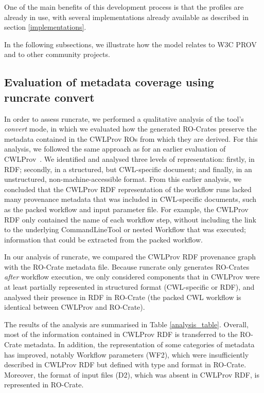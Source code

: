 \documentclass[10pt,letterpaper]{article}
\begin{document}
One of the main benefits of this development process is that the profiles are already in use, with several implementations already available as described in section \ref{implementations}.

In the following subsections, we illustrate how the model relates to W3C PROV and to other community projects.


\subsection{Evaluation of metadata coverage using runcrate convert}

In order to assess runcrate, we performed a qualitative analysis of the tool's \emph{convert} mode, in which we evaluated how the generated RO-Crates preserve the metadata contained in the CWLProv ROs from which they are derived.
For this analysis, we followed the same approach as for an earlier evaluation of CWLProv~\cite{De Wit 2022}.
We identified and analysed three levels of representation:
firstly, in RDF; secondly, in a structured, but CWL-specific document;
and finally, in an unstructured, non-machine-accessible format.
From this earlier analysis, we concluded that the CWLProv RDF representation of the workflow runs lacked many provenance metadata that was included in CWL-specific documents, such as the packed workflow and input parameter file.
For example, the CWLProv RDF only contained the name of each workflow step, without including the link to the underlying CommandLineTool or nested Workflow that was executed; information that could be extracted from the packed workflow.

In our analysis of runcrate, we compared the CWLProv RDF provenance graph with the RO-Crate metadata file.
Because runcrate only generates RO-Crates \emph{after} workflow execution, we only considered components that in CWLProv were at least partially represented in structured format (CWL-specific or RDF), and analysed their presence in RDF in RO-Crate (the packed CWL workflow is identical between CWLProv and RO-Crate).

The results of the analysis are summarised in Table
\ref{analysis_table}.
Overall, most of the information contained in CWLProv RDF is transferred to the RO-Crate metadata.
In addition, the representation of some categories of metadata has improved, notably Workflow parameters (WF2), which were insufficiently described in CWLProv RDF but defined with type and format in RO-Crate.
Moreover, the format of input files (D2), which was absent in CWLProv RDF, is represented in RO-Crate.
\end{document}
